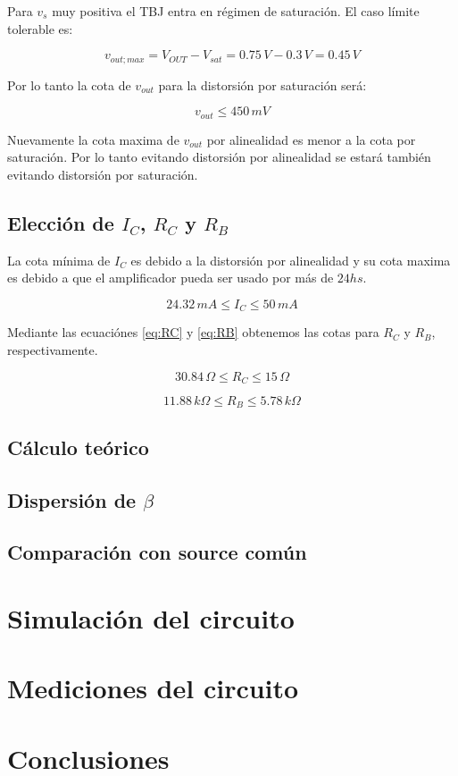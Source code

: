 \documentclass[10pt,spanish,a4paper,openany,notitlepage]{article}
\begin{document}
Para $v_s$ muy positiva el TBJ entra en régimen de saturación. El caso
límite tolerable es:

\[ \displaystyle v_{out;max} = V_{OUT} - V_{sat} = 0.75\, \unit{V} - 0.3\, \unit{V} = 0.45\, \unit{V} \]

Por lo tanto la cota de $v_{out}$ para la distorsión por saturación será:

\begin{equation}
v_{out} \leqslant 450\, \unit{mV}
\label{eq:vout_corte}
\end{equation}

Nuevamente la cota maxima de $v_{out}$ por alinealidad es menor a la cota por saturación.
Por lo tanto evitando distorsión por alinealidad se estará también evitando
distorsión por saturación.

\subsection{Elección de $I_C$, $R_C$ y $R_B$}

La cota mínima de $I_C$ es debido a la distorsión por alinealidad y
su cota maxima es debido a que el amplificador pueda ser usado por más
de $24 \unit{hs}$.

\begin{equation}
24.32\, \unit{mA}\leqslant I_C \leqslant 50\, \unit{mA}
\label{eq:IC_cotas}
\end{equation}

Mediante las ecuaciónes \ref{eq:RC} y \ref{eq:RB} obtenemos las cotas para $R_C$
y $R_B$, respectivamente.

\begin{equation}
30.84\, \unit{\Omega}\leqslant R_C \leqslant 15\, \unit{\Omega}
\label{eq:RC_cotas}
\end{equation}

\begin{equation}
11.88\, \unit{k\Omega}\leqslant R_B \leqslant 5.78\, \unit{k\Omega}
\label{eq:RB_cotas}
\end{equation}


\subsection{Cálculo teórico}

\subsection{Dispersión de $\beta$}

\subsection{Comparación con source común}

\section{Simulación del circuito}

\section{Mediciones del circuito}

\section{Conclusiones}
\end{document}
